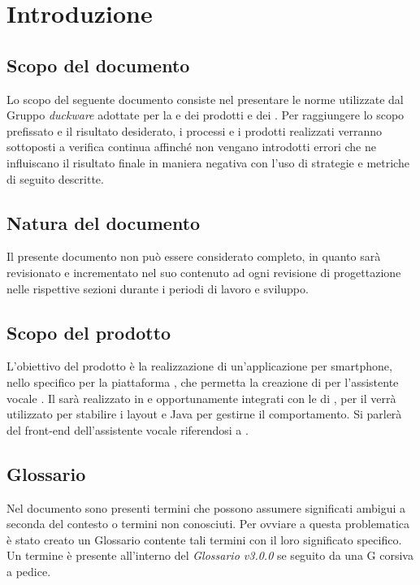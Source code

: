 \clearpage
\section{Introduzione}
\label{sec:intro}
\subsection{Scopo del documento}
Lo scopo del seguente documento consiste nel presentare le norme utilizzate dal Gruppo \emph{duckware} adottate per la  e  dei prodotti e dei . Per raggiungere lo scopo prefissato e il risultato desiderato, i processi e i prodotti realizzati verranno sottoposti a verifica continua affinché non vengano introdotti errori che ne influiscano il risultato finale in maniera negativa con l'uso di strategie e metriche di seguito descritte.
\subsection{Natura del documento}
Il presente documento non può essere considerato completo, in quanto sarà revisionato e incrementato nel suo contenuto ad ogni revisione di progettazione nelle rispettive sezioni durante i periodi di lavoro e sviluppo.
\subsection{Scopo del prodotto}
L'obiettivo del prodotto è la realizzazione di un'applicazione per smartphone, nello specifico per la piattaforma , che permetta la creazione di  per l'assistente vocale  .\newline
Il  sarà realizzato in  e  opportunamente integrati con le  di , per il  verrà utilizzato  per stabilire i layout e Java per gestirne il comportamento. Si parlerà del front-end dell'assistente vocale riferendosi a .
\subsection{Glossario}
Nel documento sono presenti termini che possono assumere significati ambigui a seconda del contesto o termini non conosciuti. Per ovviare a questa problematica è stato creato un Glossario contente tali termini con il loro significato specifico. Un termine è presente all'interno del \emph{Glossario v3.0.0} se seguito da una G corsiva a pedice.

